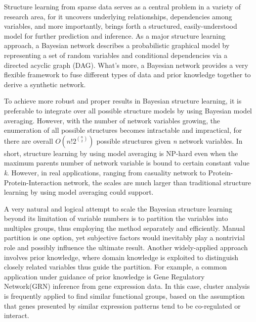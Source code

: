 Structure learning from sparse data serves as a central problem in a variety of research area, for it uncovers underlying relationships, dependencies among variables, and more importantly, brings forth a structured, easily-understood model for further prediction and inference. As a major structure learning approach, a Bayesian network describes a probabilistic graphical model by representing a set of random variables and conditional dependencies via a directed acyclic graph (DAG). What's more, a Bayesian network provides a very flexible framework to fuse different types of data and prior knowledge together to derive a synthetic network.

To achieve more robust and proper results in Bayesian structure learning, it is preferable to integrate over all possible structure models by using Bayesian model averaging. However, with the number of network variables growing, the enumeration of all possible structures becomes intractable and impractical, for there are overall $O(n!2^{\binom{n}{2}})$ possible structures given \emph{n} network variables\cite{Robinson1973}. In short, structure learning by using model averaging is NP-hard even when the maximum parents number of network variable is bound to certain constant value \emph{k}\cite{DBLP:journals/ml/HeckermanGC95}. However, in real applications, ranging from casuality network to Protein-Protein-Interaction network, the scales are much larger than traditional structure learning by using model averaging could support.

A very natural and logical attempt to scale the Bayesian structure learning beyond its limitation of variable numbers is to partition the variables into multiples groups, thus employing the method separately and efficiently. Manual partition is one option\cite{DBLP:journals/jmlr/KoivistoS04}, yet subjective factors would inevitably play a nontrivial role and possibly influence the ultimate result. Another widely-applied approach involves prior knowledge\cite{V.K.Mansinghka:2006:8d66d}, where domain knowledge is exploited to distinguish closely related variables thus guide the partition. For example, a common application under guidance of prior knowledge is Gene Regulatory Network(GRN) inference from gene expression data. In this case, cluster analysis is frequently applied to find similar functional groups, based on the assumption that genes presented by similar expression patterns tend to be co-regulated or interact\cite{geneRegulatoryNetReview}.

